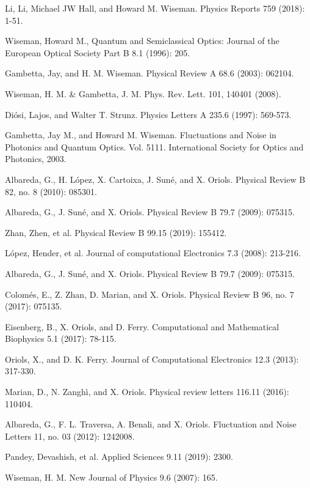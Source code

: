 \documentclass[11pt, a4paper]{article} %
\begin{document}
\begin{thebibliography}{1}
{
Li, Li, Michael JW Hall, and Howard M. Wiseman. Physics Reports 759 (2018): 1-51.

Wiseman, Howard M., Quantum and Semiclassical Optics: Journal of the European Optical Society Part B 8.1 (1996): 205.

Gambetta, Jay, and H. M. Wiseman. Physical Review A 68.6 (2003): 062104.

Wiseman, H. M. \& Gambetta, J. M. Phys. Rev. Lett. 101, 140401 (2008).

Diósi, Lajos, and Walter T. Strunz. Physics Letters A 235.6 (1997): 569-573.

Gambetta, Jay M., and Howard M. Wiseman. Fluctuations and Noise in Photonics and Quantum Optics. Vol. 5111. International Society for Optics and Photonics, 2003.

Albareda, G., H. López, X. Cartoixa, J. Suné, and X. Oriols. Physical Review B 82, no. 8 (2010): 085301.

Albareda, G., J. Suné, and X. Oriols. Physical Review B 79.7 (2009): 075315.

Zhan, Zhen, et al. Physical Review B 99.15 (2019): 155412.

López, Hender, et al. Journal of computational Electronics 7.3 (2008): 213-216.

Albareda, G., J. Suné, and X. Oriols. Physical Review B 79.7 (2009): 075315.

Colomés, E., Z. Zhan, D. Marian, and X. Oriols. Physical Review B 96, no. 7 (2017): 075135.

Eisenberg, B., X. Oriols, and D. Ferry. Computational and Mathematical Biophysics 5.1 (2017): 78-115.

Oriols, X., and D. K. Ferry. Journal of Computational Electronics 12.3 (2013): 317-330.

Marian, D., N. Zanghì, and X. Oriols. Physical review letters 116.11 (2016): 110404.

Albareda, G., F. L. Traversa, A. Benali, and X. Oriols. Fluctuation and Noise Letters 11, no. 03 (2012): 1242008.

Pandey, Devashish, et al. Applied Sciences 9.11 (2019): 2300.

Wiseman, H. M. New Journal of Physics 9.6 (2007): 165.

}
\end{thebibliography}
\end{document}
